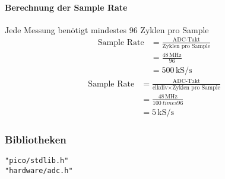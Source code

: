 \documentclass[a4paper,12pt,twoside]{article}
\begin{document}
\paragraph{Berechnung der Sample Rate}
Jede Messung benötigt mindestes 96 Zyklen pro Sample \\
\begin{align}
	\text{Sample Rate} & = \frac{\text{ADC-Takt}}{\text{Zyklen pro Sample}} \\
	                   & = \frac{48\,\text{MHz}}{96}                        \\
	                   & = 500\,\text{kS/s}
\end{align}
\begin{align}
	\text{Sample Rate} & = \frac{\text{ADC-Takt}}{\text{clkdiv} \times \text{Zyklen pro Sample}} \\
	                   & = \frac{48\,\text{MHz}}{100 \ times 96}                                 \\
	                   & = 5\,\text{kS/s}
\end{align}
\subsubsection{Bibliotheken}
\verb|"pico/stdlib.h"| \\
\verb|"hardware/adc.h"| \\
\end{document}

